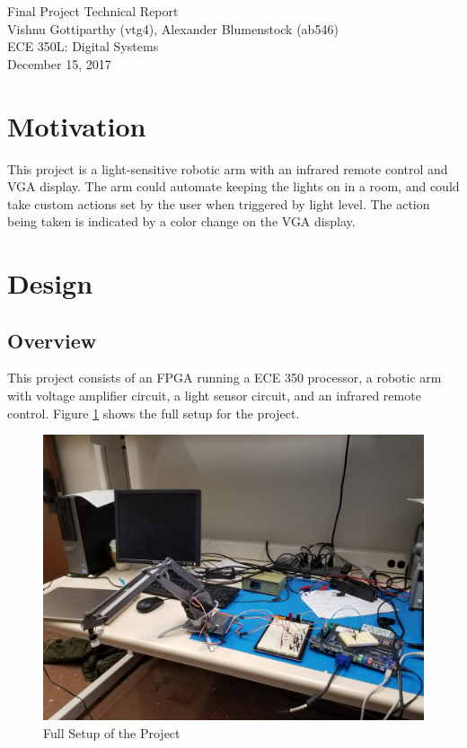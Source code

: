 \documentclass{article}
\begin{document}
\begin{center}
\huge{Final Project Technical Report} \\
\small{Vishnu Gottiparthy (vtg4), Alexander Blumenstock (ab546)} \\
ECE 350L: Digital Systems\\
December 15, 2017 \\
\end{center}

\section{Motivation}
This project is a light-sensitive robotic arm with an infrared remote control and VGA display. The arm could automate keeping the lights on in a room, and could take custom actions set by the user when triggered by light level. The action being taken is indicated by a color change on the VGA display.

\section{Design}
    \subsection{Overview}
    This project consists of an FPGA running a ECE 350 processor, a robotic arm with voltage amplifier circuit, a light sensor circuit, and an infrared remote control. Figure \ref{fig:setup} shows the full setup for the project.
    
    \begin{figure}[H]
        \centering
        \includegraphics[scale=0.07]{setup.jpg}
        \caption{Full Setup of the Project}
        \label{fig:setup}
    \end{figure}
    
\end{document}
